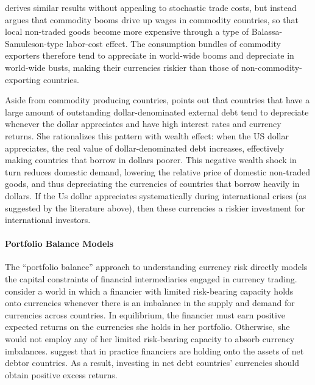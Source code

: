 \documentclass{ar-1col}
\begin{document}
\citet{Powers2015} derives similar results without appealing to stochastic trade costs, but instead argues that commodity booms drive up wages in commodity countries, so that local non-traded goods become more expensive through a type of Balassa-Samuleson-type labor-cost effect. The consumption bundles of commodity exporters therefore tend to appreciate in world-wide booms and depreciate in world-wide busts, making their currencies riskier than those of non-commodity-exporting countries.

Aside from commodity producing countries, \citet{Wiriadinata2020} points out that countries that have a large amount of outstanding dollar-denominated external debt tend to depreciate whenever the dollar appreciates and have high interest rates and currency returns. She rationalizes this pattern with wealth effect: when the US dollar appreciates, the real value of dollar-denominated debt increases, effectively making countries that borrow in dollars poorer. This negative wealth shock in turn reduces domestic demand, lowering the relative price of domestic non-traded goods, and thus depreciating the currencies of countries that borrow heavily in dollars. If the Us dollar appreciates systematically during international crises (as suggested by the literature above), then these currencies a riskier investment for international investors.


\paragraph*{Portfolio Balance Models} The  ``portfolio balance'' approach to understanding currency risk directly models the capital constraints of financial intermediaries engaged in currency trading. \citet{GabaixMaggiori2015} consider a world in which a financier with limited risk-bearing capacity holds onto currencies whenever there is an imbalance in the supply and demand for currencies across countries. In equilibrium, the financier must earn positive expected returns on the currencies she holds in her portfolio. Otherwise, she would not employ any of her limited risk-bearing capacity to absorb currency imbalances. \citet{GabaixMaggiori2015} suggest that in practice financiers are holding onto the assets of net debtor countries. As a result, investing in net debt countries' currencies should obtain positive excess returns. 
\end{document}
